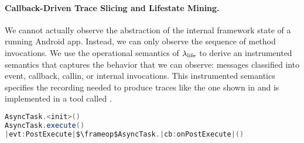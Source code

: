 \documentclass[10pt,reprint,nocopyrightspace,numbers]{sigplanconf}
\begin{document}
\paragraph{Callback-Driven Trace Slicing and Lifestate Mining.}
%
%
%
We cannot actually observe the abstraction of the
internal framework state of a running Android app. Instead, we can
only observe the sequence of method invocations.
%
We use the operational semantics of $\lambda_{\text{life}}$ to derive an
instrumented semantics that captures the behavior that we can observe:
messages classified into event, callback, callin, or internal
invocations. This instrumented semantics
specifies the recording needed to produce traces like the one shown in
and is implemented in a tool called \toolname{}.

%
\newsavebox{\SBoxFeedRemoverProjected}
\begin{lrbox}{\SBoxFeedRemoverProjected}\small
\begin{lstlisting}[language=Java,alsolanguage=exthighlighting]
AsyncTask.<init>()
AsyncTask.execute()
|evt:PostExecute|$\frameop$AsyncTask.|cb:onPostExecute|()
\end{lstlisting}
\end{lrbox}
%
\end{document}

